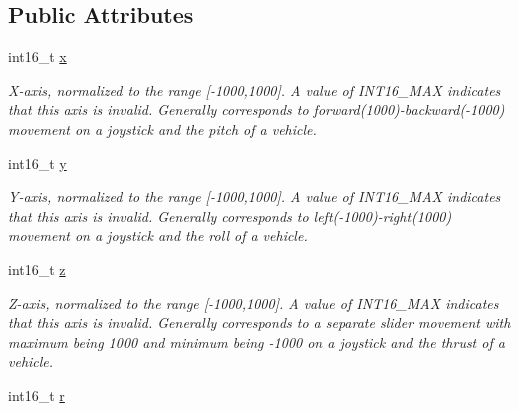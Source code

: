 \subsection*{Public Attributes}
\begin{DoxyCompactItemize}
\item 
\hypertarget{struct____mavlink__manual__control__t_add34b2bd0b54651701e7d8b2912868a6}{int16\+\_\+t \hyperlink{struct____mavlink__manual__control__t_add34b2bd0b54651701e7d8b2912868a6}{x}}\label{struct____mavlink__manual__control__t_add34b2bd0b54651701e7d8b2912868a6}

\begin{DoxyCompactList}\small\item\em X-\/axis, normalized to the range \mbox{[}-\/1000,1000\mbox{]}. A value of I\+N\+T16\+\_\+\+M\+A\+X indicates that this axis is invalid. Generally corresponds to forward(1000)-\/backward(-\/1000) movement on a joystick and the pitch of a vehicle. \end{DoxyCompactList}\item 
\hypertarget{struct____mavlink__manual__control__t_a5f705735ffdbe9c373151fe73c0abedb}{int16\+\_\+t \hyperlink{struct____mavlink__manual__control__t_a5f705735ffdbe9c373151fe73c0abedb}{y}}\label{struct____mavlink__manual__control__t_a5f705735ffdbe9c373151fe73c0abedb}

\begin{DoxyCompactList}\small\item\em Y-\/axis, normalized to the range \mbox{[}-\/1000,1000\mbox{]}. A value of I\+N\+T16\+\_\+\+M\+A\+X indicates that this axis is invalid. Generally corresponds to left(-\/1000)-\/right(1000) movement on a joystick and the roll of a vehicle. \end{DoxyCompactList}\item 
\hypertarget{struct____mavlink__manual__control__t_a9e3fd9d9bcd622e31cca4d44f66343c1}{int16\+\_\+t \hyperlink{struct____mavlink__manual__control__t_a9e3fd9d9bcd622e31cca4d44f66343c1}{z}}\label{struct____mavlink__manual__control__t_a9e3fd9d9bcd622e31cca4d44f66343c1}

\begin{DoxyCompactList}\small\item\em Z-\/axis, normalized to the range \mbox{[}-\/1000,1000\mbox{]}. A value of I\+N\+T16\+\_\+\+M\+A\+X indicates that this axis is invalid. Generally corresponds to a separate slider movement with maximum being 1000 and minimum being -\/1000 on a joystick and the thrust of a vehicle. \end{DoxyCompactList}\item 
\hypertarget{struct____mavlink__manual__control__t_a7311c5d986a66ba78c8f3c62e6163d8b}{int16\+\_\+t \hyperlink{struct____mavlink__manual__control__t_a7311c5d986a66ba78c8f3c62e6163d8b}{r}}\label{struct____mavlink__manual__control__t_a7311c5d986a66ba78c8f3c62e6163d8b}


\end{DoxyCompactItemize}
